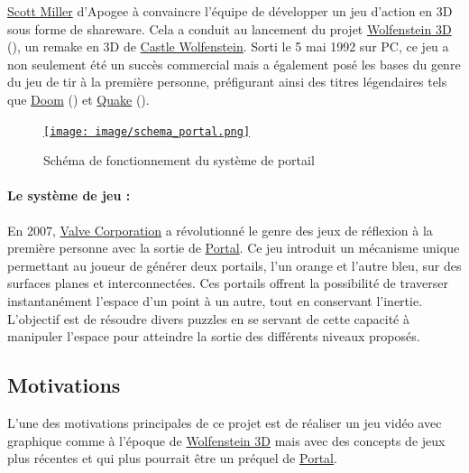 \documentclass[11pt]{article}
\begin{document}
\href{https://fr.wikipedia.org/wiki/Scott_Miller_(programmeur)}{Scott Miller}\cite{Scott_Miller} d'Apogee à convaincre l'équipe de 
développer un jeu d'action en 3D sous forme de shareware. Cela a conduit au lancement du projet 
\href{https://fr.wikipedia.org/wiki/Wolfenstein_3D}{Wolfenstein 3D}\cite{Wolfenstein3D} (), un remake en 3D de 
\href{https://fr.wikipedia.org/wiki/Castle_Wolfenstein}{Castle Wolfenstein}\cite{Castle_Wolfenstein}. Sorti le 5 mai 1992 sur PC, ce jeu a 
non seulement été un succès commercial mais a également posé les bases du genre du jeu de tir à la première personne, 
préfigurant ainsi des titres légendaires tels que 
\href{https://fr.wikipedia.org/wiki/Doom_(jeu_vid%C3%A9o,_1993)}{Doom}\cite{Doom_1993} (\nameref{fig:doom_1993}) et 
\href{https://fr.wikipedia.org/wiki/Quake}{Quake}\cite{Quake} ().

\begin{figure}
	\centering
	\href{https://fr.wikipedia.org/wiki/Portal_(jeu_vid%C3%A9o)}{\texttt{[image: image/schema\_portal.png]}}
	\hspace*{-0.5cm}
	\caption{Schéma de fonctionnement du système de portail}
	\label{fig:schema_portal}
\end{figure}

\paragraph{Le système de jeu : }
En 2007, \href{https://fr.wikipedia.org/wiki/Valve_Corporation}{Valve Corporation}\cite{Valve_Corporation} a révolutionné le genre des jeux 
de réflexion à la première personne avec la sortie de 
\href{https://fr.wikipedia.org/wiki/Portal_(jeu_vid%C3%A9o)}{Portal}\cite{Portal}. Ce jeu introduit un mécanisme unique 
permettant au joueur de générer deux portails, l'un orange et l'autre bleu, sur des surfaces planes et 
interconnectées. Ces portails offrent la possibilité de traverser instantanément l'espace d'un point à un autre, 
tout en conservant l'inertie. L'objectif est de résoudre divers puzzles en se servant de cette capacité à manipuler 
l'espace pour atteindre la sortie des différents niveaux proposés.



\subsection{Motivations}


L'une des motivations principales de ce projet est de réaliser un jeu vidéo
avec graphique comme à l'époque de \href{https://fr.wikipedia.org/wiki/Wolfenstein_3D}{Wolfenstein 3D}\cite{Wolfenstein3D}
mais avec des concepts de jeux plus récentes et qui plus pourrait être
un préquel de \href{https://fr.wikipedia.org/wiki/Portal_(jeu_vid%C3%A9o)}{Portal}\cite{Portal}.
\end{document}
